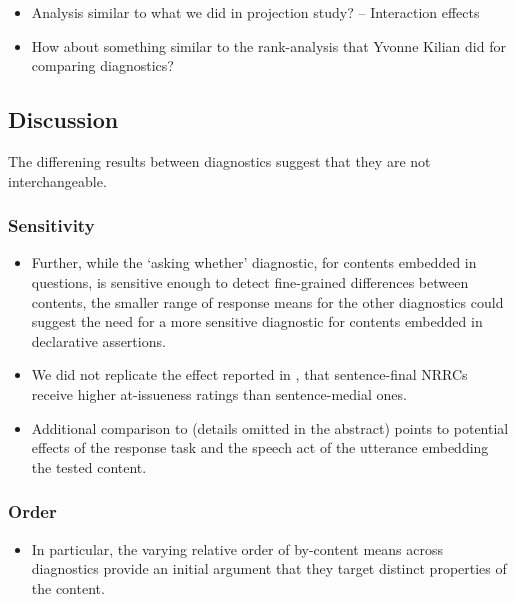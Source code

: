 \documentclass[12pt]{article}
\begin{document}
    \begin{itemize}
      \item Analysis similar to what we did in projection study? -- Interaction effects
      \item How about something similar to the rank-analysis that Yvonne Kilian did for comparing diagnostics?

    \end{itemize}


  \subsection{Discussion}
    The differening results between diagnostics suggest that they are not interchangeable.

    \subsubsection{Sensitivity}

      \begin{itemize}
        \item Further, while the `asking whether' diagnostic, for contents embedded in questions, is sensitive enough to detect fine-grained differences between contents, the smaller range of response means for the other diagnostics could suggest the need for a more sensitive diagnostic for contents embedded in declarative assertions.

        \item We did not replicate the effect reported in \citealt{syrett_experimental_2015}, that sentence-final NRRCs receive higher at-issueness ratings than sentence-medial ones.

        \item  Additional comparison to \citealt{syrett_experimental_2015} (details omitted in the abstract) points to potential effects of the response task and the speech act of the utterance embedding the tested content.

      \end{itemize}

    \subsubsection{Order}

      \begin{itemize}
        \item In particular, the varying relative order of by-content means across diagnostics provide an initial argument that they target distinct properties of the content.
      \end{itemize}
\end{document}

